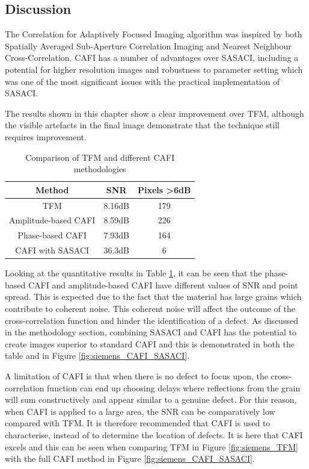 \subsection{Discussion}\label{sec:cafi_discussion}

The Correlation for Adaptively Focused Imaging algorithm was inspired by both Spatially Averaged Sub-Aperture Correlation Imaging and Nearest Neighbour Cross-Correlation. CAFI has a number of advantages over SASACI, including a potential for higher resolution images and robustness to parameter setting which was one of the most significant issues with the practical implementation of SASACI.

The results shown in this chapter show a clear improvement over TFM, although the visible artefacts in the final image demonstrate that the technique still requires improvement.

\begin{table}[ht]
\begin{center}
	\begin{tabular}{| c | c | c |}
	\hline 
	\textbf{Method} & \textbf{SNR} & \textbf{Pixels \textgreater 6dB}\\ \hline \hline 
	TFM	& 8.16dB & 179\\ \hline
	Amplitude-based CAFI & 8.59dB & 226 \\ \hline
	Phase-based CAFI & 7.93dB & 164\\ \hline
	CAFI with SASACI & 36.3dB & 6 \\ \hline
	\end{tabular}
	\caption{Comparison of TFM and different CAFI methodologies}
	\label{table:cafi_results}
	\end{center}
	\end{table}
	
Looking at the quantitative results in Table \ref{table:cafi_results}, it can be seen that the phase-based CAFI and amplitude-based CAFI have different values of SNR and point spread. This is expected due to the fact that the material has large grains which contribute to coherent noise. This coherent noise will affect the outcome of the cross-correlation function and hinder the identification of a defect. As discussed in the methodology section, combining SASACI and CAFI has the potential to create images superior to standard CAFI and this is demonstrated in both the table and in Figure \ref{fig:siemens_CAFI_SASACI}.

A limitation of CAFI is that when there is no defect to focus upon, the cross-correlation function can end up choosing delays where reflections from the grain will sum constructively and appear similar to a genuine defect. For this reason, when CAFI is applied to a large area, the SNR can be comparatively low compared with TFM. It is therefore recommended that CAFI is used to characterise, instead of to determine the location of defects. It is here that CAFI excels and this can be seen when comparing TFM in Figure \ref{fig:siemens_TFM} with the full CAFI method in Figure \ref{fig:siemens_CAFI_SASACI}.

